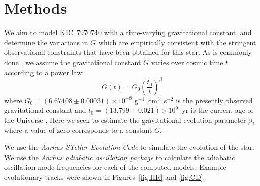 \documentclass[twocolumn]{aastex63}
\begin{document}
\section{Methods} 
We aim to model KIC~7970740 with a time-varying gravitational constant, and determine the variations in $G$ which are empirically consistent with the stringent observational constraints that have been obtained for this star. 
As is commonly done \citep[e.g.,][]{1994ApJ...437..870D, 1998ApJ...498..871G, 1996A&A...312..345D}, we assume the gravitational constant $G$ varies over cosmic time $t$ according to a power law:
\begin{equation} \label{eq:pow-law}
    G(t) = G_0 \left(
        \frac{t_0}{t}
    \right)^\beta
\end{equation}
where ${G_0 = (6.67408 \pm 0.00031)\times 10^{-8}}$ g$^{-1}$~cm$^{3}$~s$^{-2}$ is the presently observed gravitational constant \citep{2016RvMP...88c5009M} and ${t_0=(13.799 \pm 0.021)\times 10^9}$~yr is the current age of the Universe \citep{2016A&A...594A..13P}. 
Here we seek to estimate the gravitational evolution parameter $\beta$, where a value of zero corresponds to a constant $G$. 

We use the \emph{Aarhus STellar Evolution Code} \citep[ASTEC,][]{2008Ap&SS.316...13C} to simulate the evolution of the star. 
We use the \emph{Aarhus adiabatic oscillation package} \citep[ADIPLS,][]{2008Ap&SS.316..113C} to calculate the adiabatic oscillation mode frequencies for each of the computed models. 
Example evolutionary tracks were shown in Figures~\ref{fig:HR} and \ref{fig:CD}. 
\end{document}
